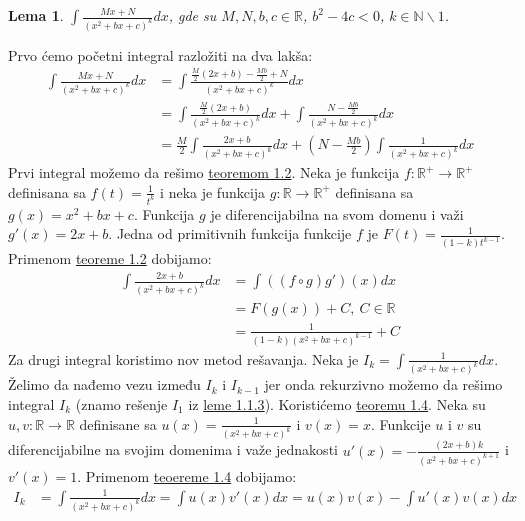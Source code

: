 \documentclass{article}
\newtheorem{lema}{Lema}[section]
\begin{document}
\begin{lemabox}
    \begin{lema}
        \label{lema_1.1.4}
        $\int \frac{Mx+N}{(x^2+bx+c)^k}dx$, gde su $M,N,b,c\in\mathbb{R}$, $b^2 - 4c < 0$, $k\in\mathbb{N}\backslash{1}$.
    \end{lema}
    Prvo ćemo početni integral razložiti na dva lakša:
    \begin{align*}
        \int \frac{Mx+N}{(x^2+bx+c)^k}dx & =\int \frac{\frac{M}{2}(2x+b)-\frac{Mb}{2}+N}{(x^2+bx+c)^k}dx                             \\
                                         & =\int \frac{\frac{M}{2}(2x+b)}{(x^2+bx+c)^k}dx+\int\frac{N-\frac{Mb}{2}}{(x^2+bx+c)^k}dx  \\
                                         & =\frac{M}{2}\int \frac{2x+b}{(x^2+bx+c)^k}dx+(N-\frac{Mb}{2})\int\frac{1}{(x^2+bx+c)^k}dx
    \end{align*}
    Prvi integral možemo da rešimo \hyperref[teorema_1.2]{teoremom 1.2}. Neka je
    funkcija $f: \mathbb{R}^{+}\longrightarrow\mathbb{R}^{+}$ definisana sa
    $f(t)=\frac{1}{t^k}$ i neka je funkcija $g: \mathbb{R}\longrightarrow\mathbb{R}^{+}$
    definisana sa $g(x)=x^2+bx+c$. Funkcija $g$ je diferencijabilna na svom domenu
    i važi $g'(x)=2x+b$. Jedna od primitivnih funkcija funkcije $f$ je $F(t)=\frac{1}{(1-k)t^{k-1}}$.
    Primenom \hyperref[teorema_1.2]{teoreme 1.2} dobijamo:
    \begin{align*}
        \int \frac{2x+b}{(x^2+bx+c)^k}dx & =\int((f\circ g)g')(x)dx           \\
                                         & =F(g(x))+C,\ C\in\mathbb{R}        \\
                                         & =\frac{1}{(1-k)(x^2+bx+c)^{k-1}}+C
    \end{align*}
    Za drugi integral koristimo nov metod rešavanja.
    Neka je $I_k=\int\frac{1}{(x^2+bx+c)^k}dx$. Želimo da nađemo vezu
    između $I_k$ i $I_{k-1}$ jer onda rekurzivno možemo da
    rešimo integral $I_k$ (znamo rešenje $I_1$ iz \hyperref[lema_1.1.3]{leme 1.1.3}). Koristićemo \hyperref[teorema_1.4]{teoremu 1.4}.
    Neka su $u,v:\mathbb{R}\longrightarrow\mathbb{R}$ definisane sa $u(x)=\frac{1}{(x^2+bx+c)^k}$
    i $v(x)=x$. Funkcije $u$ i $v$ su diferencijabilne na svojim domenima i
    važe jednakosti $u'(x)=-\frac{(2x+b)k}{(x^2+bx+c)^{k+1}}$ i $v'(x)=1$.
    Primenom \hyperref[teorema_1.4]{teoereme 1.4} dobijamo:
    \begin{align*}
        I_k       & =\int\frac{1}{(x^2+bx+c)^k}dx =\int u(x)v'(x)dx =u(x)v(x)-\int u'(x)v(x)dx                                       \\

\end{align*}
\end{lemabox}
\end{document}
